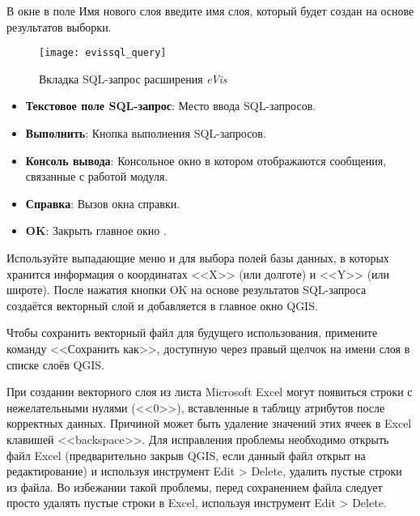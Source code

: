 В окне  в поле Имя нового слоя введите имя слоя,
который будет создан на основе результатов выборки.

\begin{figure}[ht]
   \centering
   \texttt{[image: evissql\_query]}
   \caption{\label{evissql_query}Вкладка SQL-запрос расширения \emph{eVis}
   \wincaption}
\end{figure}

\begin{itemize}[label=--]
\item \textbf{Текстовое поле SQL-запрос}: Место ввода SQL-запросов.
\item \textbf{Выполнить}: Кнопка выполнения SQL-запросов.
\item \textbf{Консоль вывода}: Консольное окно в котором отображаются
сообщения, связанные с работой модуля.
\item \textbf{Справка}: Вызов окна справки.
\item \textbf{OK}: Закрыть главное окно .
\end{itemize}

Используйте выпадающие меню  и
 для выбора полей базы данных, в которых хранится
информация о координатах <<X>> (или долготе) и <<Y>> (или широте). После
нажатия кнопки OK на основе результатов SQL-запроса создаётся векторный
слой и добавляется в главное окно QGIS.

Чтобы сохранить векторный файл для будущего использования, примените
команду <<Сохранить как>>, доступную через правый щелчок на имени слоя в
списке слоёв QGIS.

\begin{Tip}\caption{\textsc{Создание векторного слоя на основе данных
листа Microsoft Excel}} При создании векторного слоя из листа Microsoft
Excel могут появиться строки с нежелательными нулями (<<0>>), вставленные
в таблицу атрибутов после корректных данных. Причиной может быть удаление
значений этих ячеек в Excel клавишей <<backspace>>. Для исправления проблемы
необходимо открыть файл Excel (предварительно закрыв QGIS, если данный файл
открыт на редактирование) и используя инструмент Edit > Delete, удалить
пустые строки из файла. Во избежании такой проблемы, перед сохранением
файла следует просто удалять пустые строки в Excel, используя инструмент
Edit > Delete.
\end{Tip}

\label{evis_predefined}

